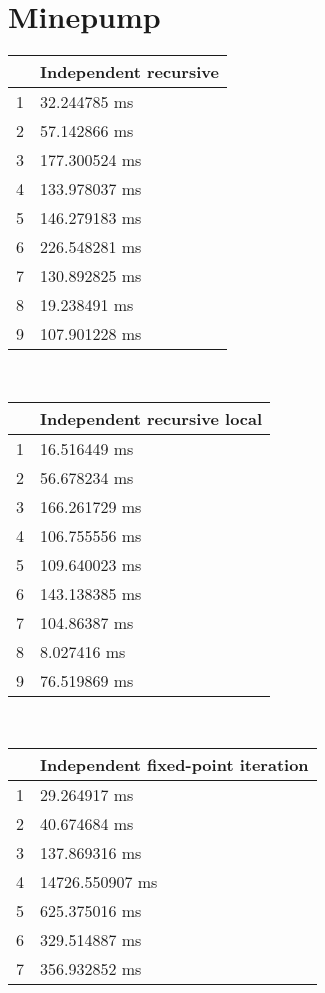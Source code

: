 \footnotesize 
\section{Minepump}
\begin{multicols}{2}
	\begin{tabular}{|l|l|}
		\hline
		& Independent recursive \\ \hline
		1 & 32.244785 ms \\ \hline
		2 & 57.142866 ms \\ \hline
		3 & 177.300524 ms \\ \hline
		4 & 133.978037 ms \\ \hline
		5 & 146.279183 ms \\ \hline
		6 & 226.548281 ms \\ \hline
		7 & 130.892825 ms \\ \hline
		8 & 19.238491 ms \\ \hline
		9 & 107.901228 ms \\ \hline
	\end{tabular}\\
	\begin{tabular}{|l|l|}
		\hline
		& Independent recursive local \\ \hline
		1 & 16.516449 ms \\ \hline
		2 & 56.678234 ms \\ \hline
		3 & 166.261729 ms \\ \hline
		4 & 106.755556 ms \\ \hline
		5 & 109.640023 ms \\ \hline
		6 & 143.138385 ms \\ \hline
		7 & 104.86387 ms \\ \hline
		8 & 8.027416 ms \\ \hline
		9 & 76.519869 ms \\ \hline
	\end{tabular}\\
	\begin{tabular}{|l|l|}
		\hline
		& Independent fixed-point iteration \\ \hline
		1 & 29.264917 ms \\ \hline
		2 & 40.674684 ms \\ \hline
		3 & 137.869316 ms \\ \hline
		4 & 14726.550907 ms \\ \hline
		5 & 625.375016 ms \\ \hline
		6 & 329.514887 ms \\ \hline
		7 & 356.932852 ms \\ \hline

\end{tabular}
\end{multicols}
